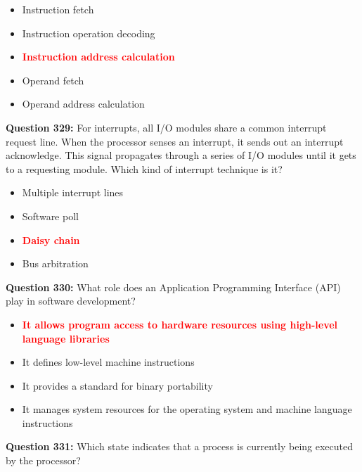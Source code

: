 \documentclass[12pt,a4paper]{article}
\begin{document}
\begin{itemize}
    \item[\textbf{A.}] Instruction fetch
    \item[\textbf{B.}] Instruction operation decoding
    \item[\textbf{C.}] \textcolor{red}{\textbf{Instruction address calculation}}
    \item[\textbf{D.}] Operand fetch
    \item[\textbf{E.}] Operand address calculation
\end{itemize}

\vspace{0.5cm}

\textbf{Question 329:} For interrupts, all I/O modules share a common interrupt request line. When the processor senses an interrupt, it sends out an interrupt acknowledge. This signal propagates through a series of I/O modules until it gets to a requesting module. Which kind of interrupt technique is it?

\begin{itemize}
    \item[\textbf{A.}] Multiple interrupt lines
    \item[\textbf{B.}] Software poll
    \item[\textbf{C.}] \textcolor{red}{\textbf{Daisy chain}}
    \item[\textbf{D.}] Bus arbitration
\end{itemize}

\vspace{0.5cm}

\textbf{Question 330:} What role does an Application Programming Interface (API) play in software development?

\begin{itemize}
    \item[\textbf{A.}] \textcolor{red}{\textbf{It allows program access to hardware resources using high-level language libraries}}
    \item[\textbf{B.}] It defines low-level machine instructions
    \item[\textbf{C.}] It provides a standard for binary portability
    \item[\textbf{D.}] It manages system resources for the operating system and machine language instructions
\end{itemize}

\vspace{0.5cm}

\textbf{Question 331:} Which state indicates that a process is currently being executed by the processor?
\end{document}

